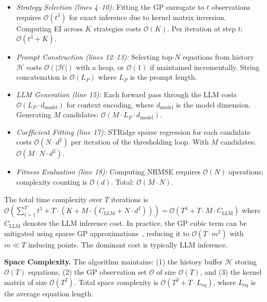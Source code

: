 \begin{itemize}
    \item \textit{Strategy Selection (lines 4--10):} Fitting the GP surrogate to $t$ observations requires $\mathcal{O}(t^3)$ for exact inference due to kernel matrix inversion. Computing EI across $K$ strategies costs $\mathcal{O}(K)$. Per iteration at step $t$: $\mathcal{O}(t^3 + K)$.
    
    \item \textit{Prompt Construction (lines 12--13):} Selecting top-$N$ equations from history $\mathcal{H}$ costs $\mathcal{O}(|\mathcal{H}|)$ with a heap, or $\mathcal{O}(1)$ if maintained incrementally. String concatenation is $\mathcal{O}(L_P)$ where $L_P$ is the prompt length.
    
    \item \textit{LLM Generation (line 15):} Each forward pass through the LLM costs $\mathcal{O}(L_P \cdot d_{\text{model}})$ for context encoding, where $d_{\text{model}}$ is the model dimension. Generating $M$ candidates: $\mathcal{O}(M \cdot L_P \cdot d_{\text{model}})$.
    
    \item \textit{Coefficient Fitting (line 17):} STRidge sparse regression for each candidate costs $\mathcal{O}(N \cdot d^2)$ per iteration of the thresholding loop. With $M$ candidates: $\mathcal{O}(M \cdot N \cdot d^2)$.
    
    \item \textit{Fitness Evaluation (line 18):} Computing NRMSE requires $\mathcal{O}(N)$ operations; complexity counting is $\mathcal{O}(d)$. Total: $\mathcal{O}(M \cdot N)$.
\end{itemize}

The total time complexity over $T$ iterations is $\mathcal{O}\left(\sum_{t=1}^{T} t^3 + T \cdot \left(K + M \cdot (C_{\text{LLM}} + N \cdot d^2)\right)\right) = \mathcal{O}(T^4 + T \cdot M \cdot C_{\text{LLM}})$ where $C_{\text{LLM}}$ denotes the LLM inference cost. In practice, the GP cubic term can be mitigated using sparse GP approximations~\cite{quinonero2005unifying}, reducing it to $\mathcal{O}(T \cdot m^2)$ with $m \ll T$ inducing points. The dominant cost is typically LLM inference.

\textbf{Space Complexity.} The algorithm maintains: (1) the history buffer $\mathcal{H}$ storing $\mathcal{O}(T)$ equations, (2) the GP observation set $\mathcal{O}$ of size $\mathcal{O}(T)$, and (3) the kernel matrix of size $\mathcal{O}(T^2)$. Total space complexity is $\mathcal{O}(T^2 + T \cdot L_{\text{eq}})$, where $L_{\text{eq}}$ is the average equation length.

